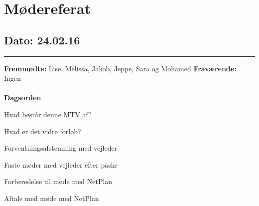 \chapter{Mødereferat}

\section{Dato: 24.02.16}
\hrule

\textbf{Fremmødte:} Lise, Melissa, Jakob, Jeppe, Sara og Mohamed
\textbf{Fraværende:} Ingen
\\
\\
\textbf{Dagsorden}
\item Hvad består denne MTV af? 
\item Hvad er det vidre forløb? 
\item Forventningsafstemning med vejleder
\item Faste møder med vejleder efter påske
\item Forberedelse til møde med NetPlan 
\item Aftale med møde med NetPlan

